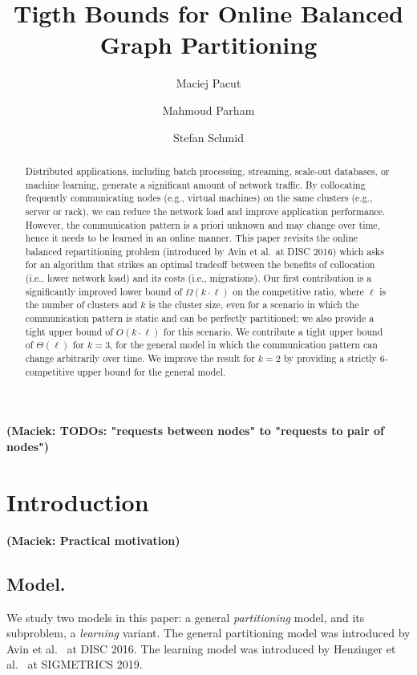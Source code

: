 \documentclass[manuscript,screen=true, review, anonymous]{acmart}
\title{Tigth Bounds for Online Balanced Graph Partitioning}
\author{Maciej Pacut}
\affiliation{%
 \institution{Faculty of Computer Science, University of Vienna}
 \country{Austria}
 }
\author{Mahmoud Parham}
\affiliation{%
 \institution{Faculty of Computer Science, University of Vienna}
 \country{Austria}
 }
\author{Stefan Schmid}
\affiliation{%
 \institution{Faculty of Computer Science, University of Vienna}
 \country{Austria}
 }
\newcommand\maciek[1]{\color{brown}\textbf{(Maciek: #1)}\color{black}}
\begin{document}
\begin{abstract}
	Distributed   applications,  including  batch  processing, streaming, scale-out databases,
	or machine learning, generate a significant amount of network traffic.
	By collocating frequently communicating nodes (e.g., virtual machines) on the same clusters (e.g., server or rack), we can reduce the network load and  improve application performance. 
	However, the communication pattern is a priori unknown and may change over time, hence it needs to be learned in an online manner.
	This paper revisits the online 
	balanced repartitioning problem 
	(introduced by Avin et al.~at DISC 2016)
	which asks for an algorithm that strikes
	an optimal tradeoff between the benefits
	of collocation (i.e., lower network load) 
	and its costs (i.e., migrations). 
	Our first contribution is a significantly improved
	lower bound of $\Omega(k\cdot \ell)$ on the
	competitive ratio, where $\ell$ is the number
	of clusters and $k$ is the cluster size,
	even for a scenario in which the communication
	pattern is static and can be perfectly partitioned;
	we also provide a tight upper bound 
	of $O(k\cdot \ell)$ for this scenario.
	We contribute a tight upper bound
	of $\Theta(\ell)$ for $k=3$,
	for the general model in which the
	communication pattern can change arbitrarily
	over time.
	We improve the result for $k=2$ by providing a strictly $6$-competitive upper bound for the general model.
	
\end{abstract}

\maketitle

\renewcommand{\shortauthors}{M.~Pacut, M.~Parham, S.~Schmid}

\maciek{TODOs: "requests between nodes" to "requests to pair of nodes"}

\section{Introduction}

\maciek{Practical motivation}

\subsection{Model.}

We study two models in this paper: a general \emph{partitioning} model, and its subproblem, a \emph{learning} variant.
The general partitioning model was introduced by Avin et al.~\cite{repartition-disc} at DISC 2016.
The learning model was introduced by Henzinger et al.~\cite{sigmetrics19_partitioning} at SIGMETRICS 2019.
\end{document}
